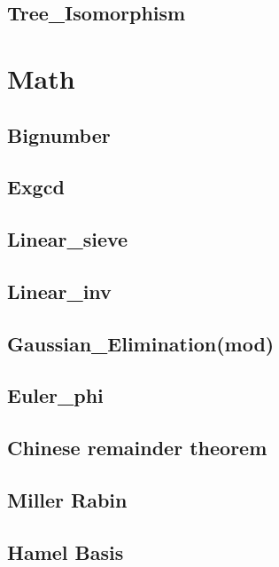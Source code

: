     \subsection{Tree\_Isomorphism}
        

\section{Math}
    \subsection{Bignumber}
        
    \subsection{Exgcd}
        
    \subsection{Linear\_sieve}
        
    \subsection{Linear\_inv}
        
    \subsection{Gaussian\_Elimination(mod)}
        
    \subsection{Euler\_phi}
        
    \subsection{Chinese remainder theorem}
        
    \subsection{Miller Rabin}
        
    \subsection{Hamel Basis}
        

